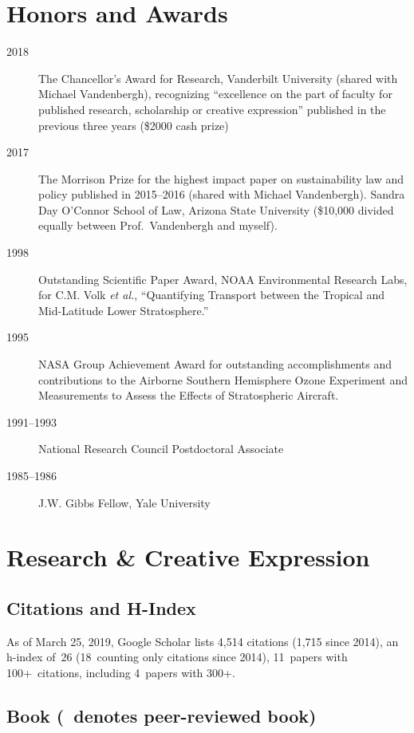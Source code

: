 \documentclass[10pt]{article}
\begin{document}
\section{Honors and Awards}
\begin{description}
\item[2018] The Chancellor's Award for Research, Vanderbilt University (shared with Michael Vandenbergh), recognizing ``excellence on the part of faculty for published research, scholarship or creative expression'' published in the previous three years (\$2000 cash prize)
\item[2017] The Morrison Prize for the highest impact paper on sustainability law and policy published in 2015--2016 (shared with Michael Vandenbergh). Sandra Day O'Connor School of Law, Arizona State University (\$10,000 divided equally between Prof.\ Vandenbergh and myself).
\item[1998] Outstanding Scientific Paper Award, NOAA Environmental Research Labs, for C.M. Volk \emph{et al.}, ``Quantifying Transport between the Tropical and Mid-Latitude Lower Stratosphere.''
\item[1995] NASA Group Achievement Award for outstanding accomplishments and contributions to the Airborne Southern Hemisphere Ozone Experiment and Measurements to Assess the Effects of Stratospheric Aircraft.
\item[1991--1993] National Research Council Postdoctoral Associate
\item[1985--1986] J.W. Gibbs Fellow, Yale University
\end{description}

\section{Research \& Creative Expression}
	\subsection{Citations and H-Index}
		As of March 25, 2019, Google Scholar lists
        4,514 citations (1,715 since 2014),
        an h-index of~26 (18~counting only citations since 2014),
        11~papers with 100+~citations, including 4~papers with 300+.
    \nocite{*}%
	\subsection[Book]{Book (\textdagger\ denotes peer-reviewed book)}
        \begin{refsection}
            \nocite{*}
            \printbibliography[heading=tenurestatus,title={Tenure Track},type=book, keyword=tenuretrack, prenote=ttnote]
        \end{refsection}
\end{document}

